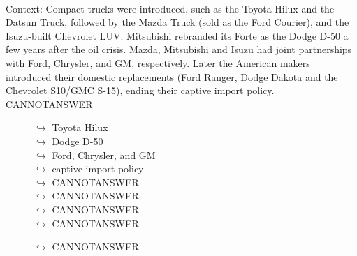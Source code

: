 \documentclass[11pt,a4paper, onecolumn]{article}
\begin{document}
\\ Context: Compact trucks were introduced, such as the Toyota Hilux and the Datsun Truck, followed by the Mazda Truck (sold as the Ford Courier), and the Isuzu-built Chevrolet LUV. Mitsubishi rebranded its Forte as the Dodge D-50 a few years after the oil crisis. Mazda, Mitsubishi and Isuzu had joint partnerships with Ford, Chrysler, and GM, respectively. Later the American makers introduced their domestic replacements (Ford Ranger, Dodge Dakota and the Chevrolet S10/GMC S-15), ending their captive import policy. CANNOTANSWER

\begin{figure}[t] \small \begin{tcolorbox}[boxsep=0pt,left=5pt,right=0pt,top=2pt,colback = yellow!5] \begin{dialogue}
 \small 
\colorbox{pink!25}{$\hookrightarrow$}
{ Toyota Hilux }
\\
\colorbox{pink!25}{$\hookrightarrow$}
{ Dodge D-50 }
\\
\colorbox{pink!25}{$\hookrightarrow$}
{ Ford, Chrysler, and GM }
\\
\colorbox{pink!25}{$\hookrightarrow$}
{ captive import policy }
\\
\colorbox{pink!25}{$\hookrightarrow$}
{ CANNOTANSWER }
\\
\colorbox{pink!25}{$\hookrightarrow$}
{ CANNOTANSWER }
\\
\colorbox{pink!25}{$\hookrightarrow$}
{ CANNOTANSWER }
\\
\colorbox{pink!25}{$\hookrightarrow$}
{ CANNOTANSWER }
 \end{dialogue}\end{tcolorbox}\end{figure}\begin{figure}[t] \small \begin{tcolorbox}[boxsep=0pt,left=5pt,right=0pt,top=2pt,colback = yellow!5] \begin{dialogue}
 \small 
\colorbox{pink!25}{$\hookrightarrow$}
{ CANNOTANSWER }
\\
 \end{dialogue}\end{tcolorbox}\end{figure}
\end{document}
